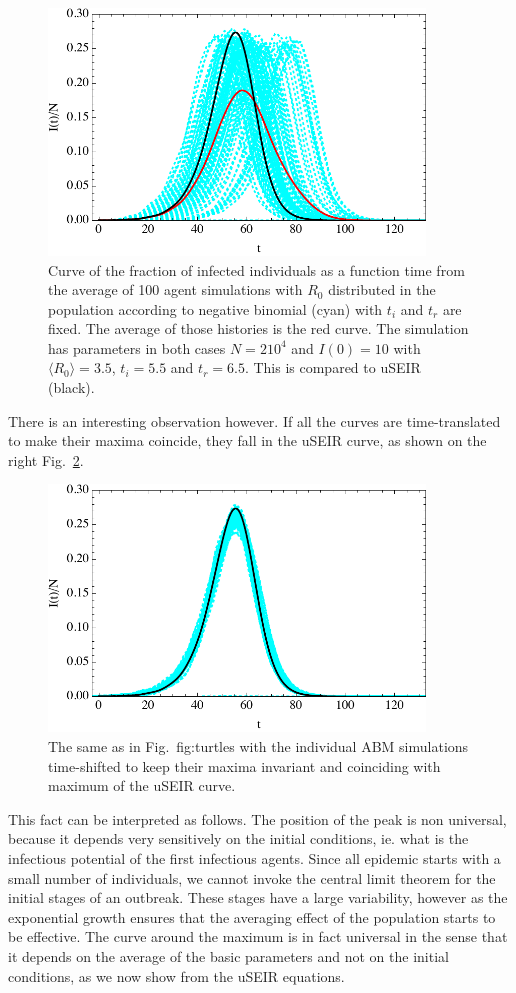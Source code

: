 \documentclass[a4paper,oneside,11pt]{article}
\begin{document}
 \begin{figure}[h!]
  \centering
\includegraphics[width=10cm]{turtlesraw.pdf}
  \caption{ Curve of the fraction of infected individuals as a function time from the average of 100 agent simulations with $R_0$ distributed in the population according to negative binomial (cyan) with $t_i$ and $t_r$ are fixed. The average of those histories is the red curve. The simulation has parameters in both cases $N= 2 10^4$ and $I(0)=10$ with $\langle R_0\rangle=3.5$, $t_i=5.5$ and $t_r=6.5$. This is compared to uSEIR (black).}
  \label{fig:turtlesraw}
   \end{figure}


  There is an interesting observation however. If all the curves are time-translated  to make their maxima coincide, they fall in the uSEIR curve, as shown on the right Fig.~\ref{fig:turtlesshift}.
  \begin{figure}[h!]
  \centering
\includegraphics[width=10cm]{turtlesshift.pdf}
  \caption{ The same as in Fig.~{fig:turtles} with the individual ABM simulations time-shifted to keep their maxima invariant and coinciding with maximum of the uSEIR curve.}
  \label{fig:turtlesshift}
   \end{figure}

  This fact can be interpreted as follows. The position of the peak is non universal, because it depends very sensitively on the initial conditions, ie. what is the infectious potential of the first infectious agents. Since all epidemic starts with a small number of individuals, we cannot invoke the central limit theorem for the initial stages of an outbreak. These stages have a large variability, however as the exponential growth ensures that the averaging effect of the population starts to be effective. The curve around the maximum is in fact universal in the sense that it depends on the average of the basic parameters and not on the initial conditions, as we now show from the uSEIR equations.
\end{document}
